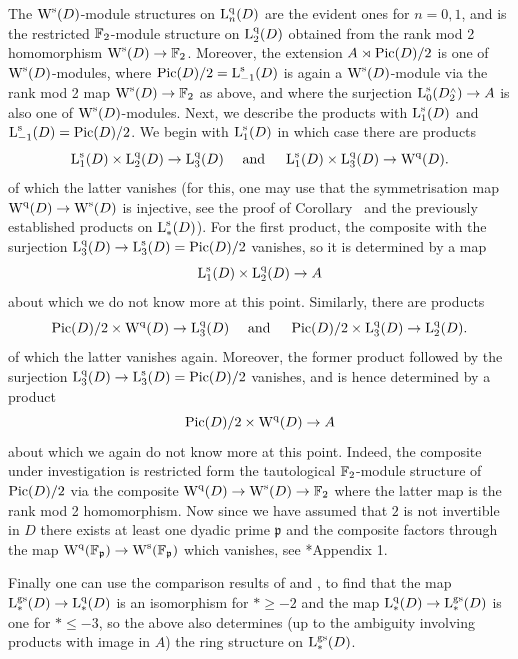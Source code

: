 \begin{example}
The $\operatorname W^{\mathrm{s}}(D)$-module structures on $\operatorname L_n^{\mathrm{q}}(D)$ are the evident ones for $n=0,1$, and is the restricted $\mathbb{F}_2$-module structure on $\operatorname L^{\mathrm{q}}_2(D)$ obtained from the rank mod 2 homomorphism $\operatorname W^{\mathrm{s}}(D) \to \mathbb{F}_2$. Moreover, the extension $A \rtimes \operatorname{Pic}(D)/2$ is one of $\operatorname W^{\mathrm{s}}(D)$-modules, where $\operatorname{Pic}(D)/2 = \operatorname L_{-1}^{\mathrm{s}}(D)$ is again a $\operatorname W^{\mathrm{s}}(D)$-module via the rank mod 2 map $\operatorname W^{\mathrm{s}}(D) \to \mathbb{F}_2$ as above, and where the surjection $\operatorname L_0^{\mathrm{s}}(D^{\scriptscriptstyle\wedge}_2) \to A$ is also one of $\operatorname W^{\mathrm{s}}(D)$-modules.
Next, we describe the products with $\operatorname L_1^{\mathrm{s}}(D)$ and $\operatorname L_{-1}^{\mathrm{s}}(D)=\operatorname{Pic}(D)/2$. We begin with $\operatorname L_1^{\mathrm{s}}(D)$ in which case there are products
\[
\operatorname L_1^{\mathrm{s}}(D) \times \operatorname L^{\mathrm{q}}_2(D) \to \operatorname L^{\mathrm{q}}_3(D) \quad \text{ and } \quad \operatorname L_1^{\mathrm{s}}(D) \times \operatorname L^{\mathrm{q}}_3(D) \to \operatorname W^{\mathrm{q}}(D).
\]
of which the latter vanishes (for this, one may use that the symmetrisation map $\operatorname W^{\mathrm{q}}(D) \to \operatorname W^{\mathrm{s}}(D)$ is injective, see the proof of Corollary~ and the previously established products on $\operatorname L^{\mathrm{s}}_*(D)$). 
For the first product, the composite with the surjection $\operatorname L^{\mathrm{q}}_3(D) \to \operatorname L^{\mathrm{s}}_3(D)=\operatorname{Pic}(D)/2$ vanishes, so it is determined by a map
\[
\operatorname L_1^{\mathrm{s}}(D) \times \operatorname L_2^{\mathrm{q}}(D) \to A
\]
about which we do not know more at this point.
Similarly, there are products
\[
\operatorname{Pic}(D)/2 \times \operatorname W^{\mathrm{q}}(D) \to \operatorname L_{3}^{\mathrm{q}}(D) \quad \text{ and } \quad \operatorname{Pic}(D)/2 \times \operatorname L^{\mathrm{q}}_3(D) \to \operatorname L^{\mathrm{q}}_2(D).
\]
of which the latter vanishes again. 
Moreover, the former product followed by the surjection $\operatorname L^{\mathrm{q}}_3(D) \to \operatorname L^{\mathrm{s}}_3(D)=\operatorname{Pic}(D)/2$ vanishes, and is hence determined by a product 
\[
\operatorname{Pic}(D)/2 \times \operatorname W^{\mathrm{q}}(D) \to A
\]
about which we again do not know more at this point.
Indeed, the composite under investigation is restricted form the tautological $\mathbb{F}_2$-module structure of $\operatorname{Pic}(D)/2$ via the composite $\operatorname W^{\mathrm{q}}(D) \to \operatorname W^{\mathrm{s}}(D) \to \mathbb{F}_2$ where the latter map is the rank mod 2 homomorphism. Now since we have assumed that $2$ is not invertible in $D$ there exists at least one dyadic prime $\mathfrak{p}$ and the  composite factors through the map $\operatorname W^{\mathrm{q}}(\mathbb{F}_\mathfrak{p}) \to \operatorname W^{\mathrm{s}}(\mathbb{F}_\mathfrak{p})$ which vanishes, see \cite{milnor-symmetric}*{Appendix 1}. 

Finally one can use the comparison results of \paperthree and \cite{Schlichting-genuine}, to find that the map $\operatorname L^{\mathrm{gs}}_*(D) \to \operatorname L^{\mathrm{q}}_*(D)$ is an isomorphism for $* \geq -2$ and the map $\operatorname L^{\mathrm{q}}_*(D) \to \operatorname L^{\mathrm{gs}}_*(D)$ is one for $* \leq -3$, so the above also determines (up to the ambiguity involving products with image in $A$) the ring structure on $\operatorname L^{\mathrm{gs}}_*(D)$.
\end{example}






